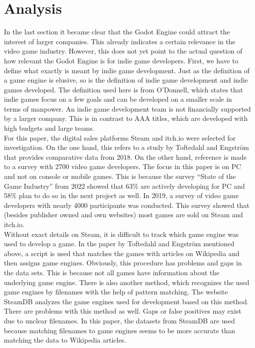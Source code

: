 \section{Analysis}
In the last section it became clear that the Godot Engine could attract the interest of larger companies.
This already indicates a certain relevance in the video game industry.
However, this does not yet point to the actual question of how relevant the Godot Engine is for indie game developers.
First, we have to define what exactly is meant by indie game development.
Just as the definition of a game engine is elusive, so is the definition of indie game development and indie games developed.
The definition used here is from O'Donnell, which states that indie games focus on a few goals and can be developed on a smaller scale in terms of manpower\cite{indie-definition}.
An indie game development team is not financially supported by a larger company.
This is in contrast to AAA titles, which are developed with high budgets and large teams.\\

For this paper, the digital sales platforms Steam and itch.io were selected for investigation.
On the one hand, this refers to a study by Toftedahl and Engström that provides comparative data from 2018\cite{game-engine-taxonomy}.
On the other hand, reference is made to a survey with 2700 video game developers.
The focus in this paper is on PC and not on console or mobile games.
This is because the survey ``State of the Game Industry'' from 2022 showed that 63\% are actively developing for PC and 58\% plan to do so in the next project as well\cite{gdc-2022}.
In 2019, a survey of video game developers with nearly 4000 participants was conducted\cite{gdc-2019}.
This survey showed that (besides publisher owned and own websites) most games are sold on Steam and itch.io.\\

Without exact details on Steam, it is difficult to track which game engine was used to develop a game.
In the paper by Toftedahl and Engström mentioned above, a script is used that matches the games with articles on Wikipedia and then assigns game engines.
Obviously, this procedure has problems and gaps in the data sets.
This is because not all games have information about the underlying game engine.
There is also another method, which recognizes the used game engines by filenames with the help of pattern matching.
The website SteamDB analyzes the game engines used for development based on this method\cite{steamdb-tech}.
There are problems with this method as well.
Gaps or false positives may exist due to unclear filenames.
In this paper, the datasets from SteamDB are used because matching filenames to game engines seems to be more accurate than matching the data to Wikipedia articles.\\

